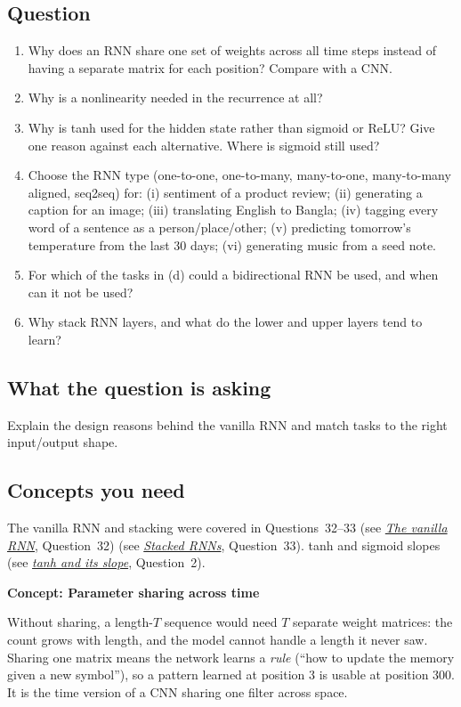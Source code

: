 \documentclass[12pt,a4paper]{article}
\newcommand{\concept}[2]{\par\medskip\phantomsection\label{#1}{\large\bfseries\color{blue!50!black} Concept: #2}\par}
\newcommand{\seeconcept}[3]{(see \hyperref[#1]{\textit{#2}}, Question~#3)}
\begin{document}
\subsection*{Question}
\begin{enumerate}[label=(\alph*)]
\item Why does an RNN share one set of weights across all time steps instead of having a separate matrix for each position? Compare with a CNN.
\item Why is a nonlinearity needed in the recurrence at all?
\item Why is tanh used for the hidden state rather than sigmoid or ReLU? Give one reason against each alternative. Where is sigmoid still used?
\item Choose the RNN type (one-to-one, one-to-many, many-to-one, many-to-many aligned, seq2seq) for: (i) sentiment of a product review; (ii) generating a caption for an image; (iii) translating English to Bangla; (iv) tagging every word of a sentence as a person/place/other; (v) predicting tomorrow's temperature from the last 30 days; (vi) generating music from a seed note.
\item For which of the tasks in (d) could a bidirectional RNN be used, and when can it not be used?
\item Why stack RNN layers, and what do the lower and upper layers tend to learn?
\end{enumerate}

\subsection*{What the question is asking}
Explain the design reasons behind the vanilla RNN and match tasks to the right input/output shape.

\subsection*{Concepts you need}
The vanilla RNN and stacking were covered in Questions~32--33 \seeconcept{c:vanillarnn}{The vanilla RNN}{32} \seeconcept{c:stacked}{Stacked RNNs}{33}. tanh and sigmoid slopes \seeconcept{c:tanh}{tanh and its slope}{2}.

\concept{c:timesharing}{Parameter sharing across time}
Without sharing, a length-$T$ sequence would need $T$ separate weight matrices: the count grows with length, and the model cannot handle a length it never saw. Sharing one matrix means the network learns a \emph{rule} (``how to update the memory given a new symbol''), so a pattern learned at position 3 is usable at position 300. It is the time version of a CNN sharing one filter across space.
\end{document}
